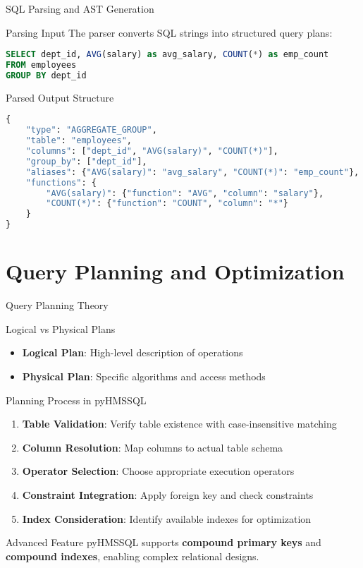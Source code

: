 \documentclass[aspectratio=169]{beamer}
\begin{document}
\begin{frame}[fragile]{SQL Parsing and AST Generation}
\begin{block}{Parsing Input}
The parser converts SQL strings into structured query plans:
\end{block}

\begin{lstlisting}[language=SQL]
SELECT dept_id, AVG(salary) as avg_salary, COUNT(*) as emp_count 
FROM employees 
GROUP BY dept_id
\end{lstlisting}

\begin{block}{Parsed Output Structure}
\begin{lstlisting}[language=Python]
{
    "type": "AGGREGATE_GROUP",
    "table": "employees",
    "columns": ["dept_id", "AVG(salary)", "COUNT(*)"],
    "group_by": ["dept_id"],
    "aliases": {"AVG(salary)": "avg_salary", "COUNT(*)": "emp_count"},
    "functions": {
        "AVG(salary)": {"function": "AVG", "column": "salary"},
        "COUNT(*)": {"function": "COUNT", "column": "*"}
    }
}
\end{lstlisting}
\end{block}
\end{frame}

\section{Query Planning and Optimization}

\begin{frame}{Query Planning Theory}
\begin{block}{Logical vs Physical Plans}
\begin{itemize}
    \item \textbf{Logical Plan}: High-level description of operations
    \item \textbf{Physical Plan}: Specific algorithms and access methods
\end{itemize}
\end{block}

\begin{block}{Planning Process in pyHMSSQL}
\begin{enumerate}
    \item \textbf{Table Validation}: Verify table existence with case-insensitive matching
    \item \textbf{Column Resolution}: Map columns to actual table schema
    \item \textbf{Operator Selection}: Choose appropriate execution operators
    \item \textbf{Constraint Integration}: Apply foreign key and check constraints
    \item \textbf{Index Consideration}: Identify available indexes for optimization
\end{enumerate}
\end{block}

\begin{alertblock}{Advanced Feature}
pyHMSSQL supports \textbf{compound primary keys} and \textbf{compound indexes}, enabling complex relational designs.
\end{alertblock}
\end{frame}
\end{document}
